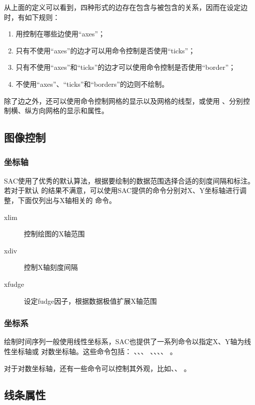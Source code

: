 从上面的定义可以看到，四种形式的边存在包含与被包含的关系，因而在设定边时，有如下规则：
\begin{enumerate}
\item 用控制在哪些边使用``axes''；
\item 只有不使用``axes''的边才可以用命令控制是否使用``ticks''；
\item 只有不使用``axes''和``ticks''的边才可以使用命令控制是否使用``border''；
\item 不使用``axes''、``ticks''和``borders''的边则不绘制。
\end{enumerate}

除了边之外，还可以使用命令控制网格的显示以及网格的线型，或使用
、分别控制横、纵方向网格的显示和属性。

\subsection{图像控制}
\subsubsection{坐标轴}
SAC使用了优秀的默认算法，根据要绘制的数据范围选择合适的刻度间隔和标注。若对于默认
的结果不满意，可以使用SAC提供的命令分别对X、Y坐标轴进行调整，下面仅列出与X轴相关的
命令。
\begin{description}
\item [xlim] 控制绘图的X轴范围
\item [xdiv] 控制X轴刻度间隔
\item [xfudge] 设定fudge因子，根据数据极值扩展X轴范围
\end{description}

\subsubsection{坐标系}
绘制时间序列一般使用线性坐标系，SAC也提供了一系列命令以指定X、Y轴为线性坐标轴或
对数坐标轴。这些命令包括： 、、、
、、、、
。

对于对数坐标轴，还有一些命令可以控制其外观，比如、、
。

\subsection{线条属性}
\label{subsec:line-attribution}

